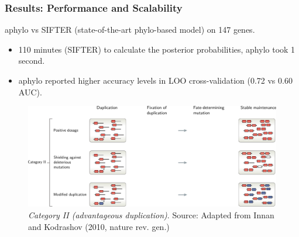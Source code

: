 \documentclass[aspectratio=169, 9pt]{beamer}
\begin{document}
\begin{frame}[c]
	\frametitle{Results: Performance and Scalability}
	aphylo vs SIFTER (state-of-the-art phylo-based model) on 147 genes.
	
	\begin{minipage}[m]{.50\linewidth}
		\bigskip
	\end{minipage}\hfill
	\begin{minipage}[m]{.45\linewidth}
		\bigskip
		\begin{itemize}
			\item<2->[]  110 minutes (SIFTER) to calculate the posterior probabilities, aphylo took 1 second.
			\item<3->[]  aphylo reported higher accuracy levels in LOO cross-validation (0.72 vs 0.60 AUC).
		\end{itemize}
	\end{minipage}
	
\end{frame}

\begin{frame}[t,label=inno-cat2]
	\begin{figure}
		\includegraphics[width=1\linewidth]{innan-kodrashov-category-ii.pdf}
		\caption{\textit{Category II (advantageous duplication)}. {\footnotesize Source: Adapted from Innan and Kodrashov (2010, nature rev. gen.)}}
	\end{figure}
	\vfill\hfill%
\end{frame}
\end{document}
